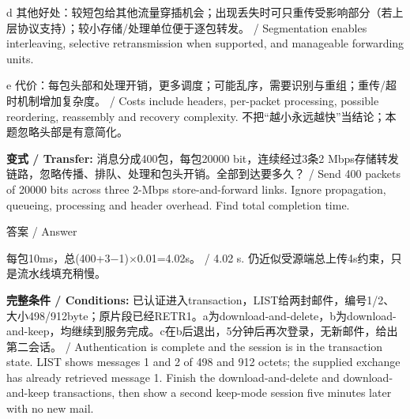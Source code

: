 



d 其他好处：较短包给其他流量穿插机会；出现丢失时可只重传受影响部分（若上层协议支持）；较小存储/处理单位便于逐包转发。 / Segmentation enables interleaving, selective retransmission when supported, and manageable forwarding units.


e 代价：每包头部和处理开销，更多调度；可能乱序，需要识别与重组；重传/超时机制增加复杂度。 / Costs include headers, per-packet processing, possible reordering, reassembly and recovery complexity. 不把“越小永远越快”当结论；本题忽略头部是有意简化。


\textbf{变式 / Transfer:} 消息分成400包，每包20000 bit，连续经过3条2 Mbps存储转发链路，忽略传播、排队、处理和包头开销。全部到达要多久？ / Send 400 packets of 20000 bits across three 2-Mbps store-and-forward links. Ignore propagation, queueing, processing and header overhead. Find total completion time.



\begin{StudySolution}{答案 / Answer}


每包10ms，总(400+3\ensuremath{-}1)\ensuremath{\times}0.01=4.02s。 / 4.02 s. 仍近似受源端总上传4s约束，只是流水线填充稍慢。


\end{StudySolution}








\textbf{完整条件 / Conditions:} 已认证进入transaction，LIST给两封邮件，编号1/2、大小498/912byte；原片段已经RETR1。a为download-and-delete，b为download-and-keep，均继续到服务完成。c在b后退出，5分钟后再次登录，无新邮件，给出第二会话。 / Authentication is complete and the session is in the transaction state. LIST shows messages 1 and 2 of 498 and 912 octets; the supplied exchange has already retrieved message 1. Finish the download-and-delete and download-and-keep transactions, then show a second keep-mode session five minutes later with no new mail.




